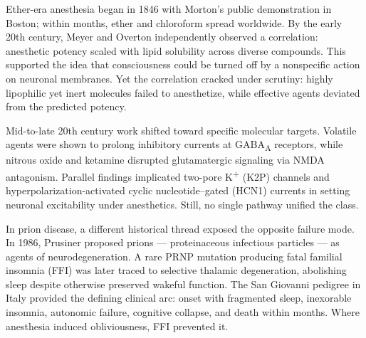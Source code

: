 \begin{historical}
Ether-era anesthesia began in 1846 with Morton’s public demonstration in Boston; within months, ether and chloroform spread worldwide. By the early 20th century, Meyer and Overton independently observed a correlation: anesthetic potency scaled with lipid solubility across diverse compounds. This supported the idea that consciousness could be turned off by a nonspecific action on neuronal membranes. Yet the correlation cracked under scrutiny: highly lipophilic yet inert molecules failed to anesthetize, while effective agents deviated from the predicted potency.

Mid-to-late 20th century work shifted toward specific molecular targets. Volatile agents were shown to prolong inhibitory currents at GABA\textsubscript{A} receptors, while nitrous oxide and ketamine disrupted glutamatergic signaling via NMDA antagonism. Parallel findings implicated two-pore K\textsuperscript{+} (K2P) channels and hyperpolarization-activated cyclic nucleotide–gated (HCN1) currents in setting neuronal excitability under anesthetics. Still, no single pathway unified the class.

In prion disease, a different historical thread exposed the opposite failure mode. In 1986, Prusiner proposed prions — proteinaceous infectious particles — as agents of neurodegeneration. A rare PRNP mutation producing fatal familial insomnia (FFI) was later traced to selective thalamic degeneration, abolishing sleep despite otherwise preserved wakeful function. The San Giovanni pedigree in Italy provided the defining clinical arc: onset with fragmented sleep, inexorable insomnia, autonomic failure, cognitive collapse, and death within months. Where anesthesia induced obliviousness, FFI prevented it.

\end{historical}
